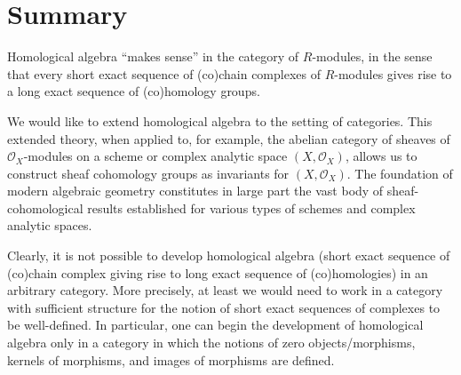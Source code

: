 

\section{Summary}
\setcounter{theorem}{0}
\setcounter{equation}{0}


\renewcommand{\theenumi}{\roman{enumi}}
\renewcommand{\labelenumi}{\textnormal{(\theenumi)}$\;\;$}


Homological algebra ``makes sense'' in the category of $R$-modules,
in the sense that every short exact sequence of (co)chain complexes of $R$-modules
gives rise to a long exact sequence of (co)homology groups.

We would like to extend homological algebra to the setting of categories.
This extended theory, when applied to, for example,
the abelian category of sheaves of $\mathcal{O}_{X}$-modules
on a scheme or complex analytic space $(X,\mathcal{O}_{X})$,
allows us to construct sheaf cohomology groups as invariants for $(X,\mathcal{O}_{X})$.
The foundation of modern algebraic geometry constitutes in large part the vast body of sheaf-cohomological results established
for various types of schemes and complex analytic spaces.

Clearly, it is not possible to develop homological algebra
(short exact sequence of (co)chain complex giving rise to long exact sequence of (co)homologies)
in an arbitrary category.
More precisely, at least we would need to work in a category with sufficient structure
for the notion of short exact sequences of complexes to be well-defined.
In particular, one can begin the development of homological algebra only in a category
in which the notions of zero objects/morphisms, kernels of morphisms, and images of morphisms are defined.

